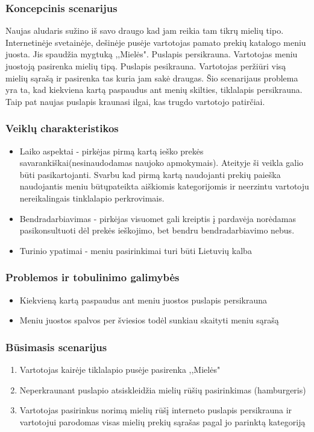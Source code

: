 \documentclass[oneside]{VUMIFPSkursinis}
\begin{document}
		\subsubsection{Koncepcinis scenarijus}
			Naujas aludaris sužino iš savo draugo kad jam reikia tam tikrų mielių tipo. 
			Internetinėje svetainėje, dešinėje pusėje vartotojas pamato prekių katalogo meniu juosta. 
			Jis spaudžia mygtuką ,,Mielės". 
			Puslapis persikrauna. 
			Vartotojas meniu juostoją pasirenka mielių tipą. 
			Puslapis pesikrauna.
			Vartotojas peržiūri visą mielių sąrašą ir pasirenka tas kuria jam sakė draugas. 
			Šio scenarijaus problema yra ta, kad kiekviena kartą paspaudus ant menių skilties, tiklalapis persikrauna. 
			Taip pat naujas puslapis kraunasi ilgai, kas trugdo vartotojo patirčiai.	
		\subsubsection{Veiklų charakteristikos}
			\begin{itemize}
				\item{Laiko aspektai - pirkėjas pirmą kartą ieško prekės savarankiškai(nesinaudodamas naujoko apmokymais). 
					Ateityje ši veikla galio būti pasikartojanti.
					Svarbu kad pirmą kartą naudojanti prekių paieška naudojantis meniu būtųpateikta aiškiomis kategorijomis ir neerzintu vartotoju nereikalingais tinklalapio perkrovimais.}
				\item{Bendradarbiavimas - pirkėjas visuomet gali kreiptis į pardavėja norėdamas pasikonsultuoti dėl prekės ieškojimo, bet bendru bendradarbiavimo nebus.}
				\item{Turinio ypatimai - meniu pasirinkimai turi būti Lietuvių kalba}
			\end{itemize}
		\subsubsection{Problemos ir tobulinimo galimybės}
			\begin{itemize}
				\item{Kiekvieną kartą paspaudus ant meniu juostos puslapis persikrauna}
				\item{Meniu juostos spalvos per šviesios todėl sunkiau skaityti meniu sąrašą}
			\end{itemize}
		\subsubsection{Būsimasis scenarijus}
			\begin{enumerate}
				\item{Vartotojas kairėje tiklalapio pusėje pasirenka ,,Mielės"}
				\item{Neperkraunant puslapio atsiskleidžia mielių rūšių pasirinkimas (hamburgeris)}
				\item{Vartotojas pasirinkus norimą mielių rūšį interneto puslapis persikrauna ir vartotojui parodomas visas mielių prekių sąrašas pagal jo parinktą kategoriją}
			\end{enumerate}
\end{document}
